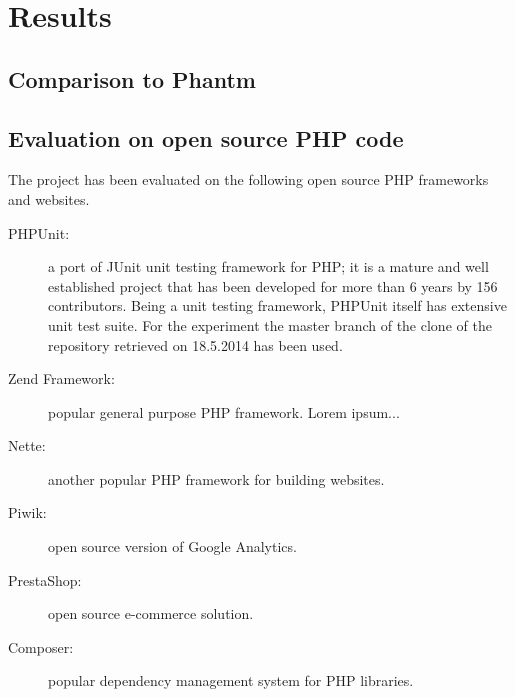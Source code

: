 \chapter{Results}


\section{Comparison to Phantm\label{phantmresults}}



\section{Evaluation on open source PHP code}

The project has been evaluated on the following open source PHP frameworks and 
websites.

\begin{description}
    \item[PHPUnit:] a port of JUnit unit testing framework for PHP; it is a mature 
    and well established project that has been developed for more than 6 years 
    by 156 contributors. Being a unit testing framework, PHPUnit itself has extensive 
    unit test suite. For the experiment the master branch of the clone of the 
    repository retrieved on 18.5.2014 has been used. 
    
    \item[Zend Framework:] popular general purpose PHP framework. Lorem ipsum...
        
    \item[Nette:] another popular PHP framework for building websites.
        
    \item[Piwik:] open source version of Google Analytics. 
    
    \item[PrestaShop:] open source e-commerce solution. 
    
    \item[Composer:] popular dependency management system for PHP libraries. 
\end{description}

